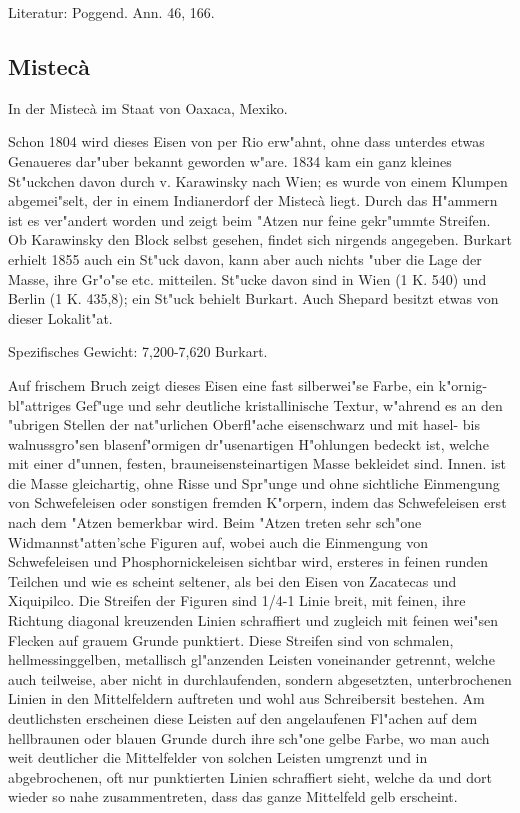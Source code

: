 \documentclass[a4paper, 11pt, oneside]{article}
\begin{document}
Literatur: Poggend. Ann. 46, 166.

\subsection{Mistecà}

In der Mistecà im Staat von Oaxaca, Mexiko.

Schon 1804 wird dieses Eisen von per Rio erw"ahnt, ohne dass unterdes etwas Genaueres dar"uber bekannt geworden w"are. 1834 kam ein ganz kleines St"uckchen davon durch v. Karawinsky nach Wien; es wurde von einem Klumpen abgemei"selt, der in einem Indianerdorf der Mistecà liegt. Durch das H"ammern ist es ver"andert worden und zeigt beim "Atzen nur feine gekr"ummte Streifen. Ob Karawinsky den Block selbst gesehen, findet sich nirgends angegeben. Burkart erhielt 1855 auch ein St"uck davon, kann aber auch nichts "uber die Lage der Masse, ihre Gr"o"se etc. mitteilen. St"ucke davon sind in Wien (1 K. 540) und Berlin (1 K. 435,8); ein St"uck behielt Burkart. Auch Shepard besitzt etwas von dieser Lokalit"at.

Spezifisches Gewicht: 7,200-7,620 Burkart.

Auf frischem Bruch zeigt dieses Eisen eine fast silberwei"se Farbe, ein k"ornig-bl"attriges Gef"uge und sehr deutliche kristallinische Textur, w"ahrend es an den "ubrigen Stellen der nat"urlichen Oberfl"ache eisenschwarz und mit hasel- bis walnussgro"sen blasenf"ormigen dr"usenartigen H"ohlungen bedeckt ist, welche mit einer d"unnen, festen, brauneisensteinartigen Masse bekleidet sind. Innen. ist die Masse gleichartig, ohne Risse und Spr"unge und ohne sichtliche Einmengung von Schwefeleisen oder sonstigen fremden K"orpern, indem das Schwefeleisen erst nach dem "Atzen bemerkbar wird. Beim "Atzen treten sehr sch"one Widmannst"atten'sche Figuren auf, wobei auch die Einmengung von Schwefeleisen und Phosphornickeleisen sichtbar wird, ersteres in feinen runden Teilchen und wie es scheint seltener, als bei den Eisen von Zacatecas und Xiquipilco. Die Streifen der Figuren sind 1/4-1 Linie breit, mit feinen, ihre Richtung diagonal kreuzenden Linien schraffiert und zugleich mit feinen wei"sen Flecken auf grauem Grunde punktiert. Diese Streifen sind von schmalen, hellmessinggelben, metallisch gl"anzenden Leisten voneinander getrennt, welche auch teilweise, aber nicht in durchlaufenden, sondern abgesetzten, unterbrochenen Linien in den Mittelfeldern auftreten und wohl aus Schreibersit bestehen. Am deutlichsten erscheinen diese Leisten auf den angelaufenen Fl"achen auf dem hellbraunen oder blauen Grunde durch ihre sch"one gelbe Farbe, wo man auch weit deutlicher die Mittelfelder von solchen Leisten umgrenzt und in abgebrochenen, oft nur punktierten Linien schraffiert sieht, welche da und dort wieder so nahe zusammentreten, dass das ganze Mittelfeld gelb erscheint.
\end{document}
